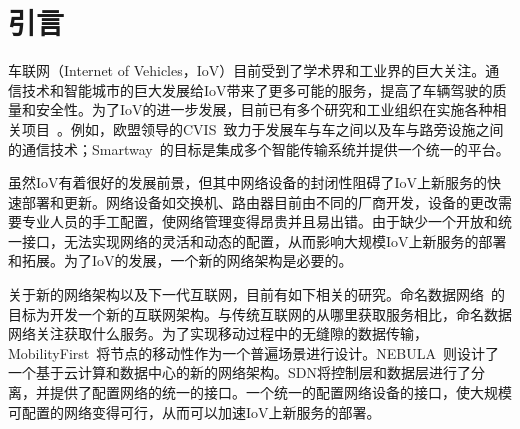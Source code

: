 \documentclass{ctexart}
\begin{document}
 
\tableofcontents

\section{引言}

车联网（Internet of Vehicles，IoV）目前受到了学术界和工业界的巨大关注。通信技术和智能城市的巨大发展给IoV带来了更多可能的服务，提高了车辆驾驶的质量和安全性。为了IoV的进一步发展，目前已有多个研究和工业组织在实施各种相关项目~\cite{CVIS, makino2005smartway}。例如，欧盟领导的CVIS~\cite{CVIS}致力于发展车与车之间以及车与路旁设施之间的通信技术；Smartway~\cite{makino2005smartway}的目标是集成多个智能传输系统并提供一个统一的平台。


虽然IoV有着很好的发展前景，但其中网络设备的封闭性阻碍了IoV上新服务的快速部署和更新。网络设备如交换机、路由器目前由不同的厂商开发，设备的更改需要专业人员的手工配置，使网络管理变得昂贵并且易出错。由于缺少一个开放和统一接口，无法实现网络的灵活和动态的配置，从而影响大规模IoV上新服务的部署和拓展。为了IoV的发展，一个新的网络架构是必要的。


关于新的网络架构以及下一代互联网，目前有如下相关的研究。命名数据网络~\cite{NDN}的目标为开发一个新的互联网架构。与传统互联网的从哪里获取服务相比，命名数据网络关注获取什么服务。为了实现移动过程中的无缝隙的数据传输，MobilityFirst~\cite{MobilityFirst}将节点的移动性作为一个普遍场景进行设计。NEBULA~\cite{NEBULA}则设计了一个基于云计算和数据中心的新的网络架构。SDN将控制层和数据层进行了分离，并提供了配置网络的统一的接口。一个统一的配置网络设备的接口，使大规模可配置的网络变得可行，从而可以加速IoV上新服务的部署。
\end{document}
